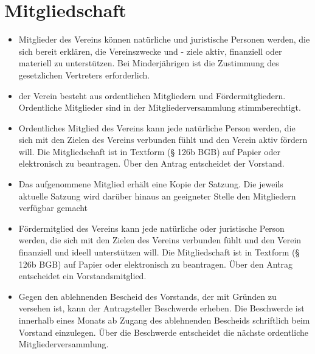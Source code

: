 \documentclass[a4paper,10pt]{article}
\begin{document}
\section{Mitgliedschaft}
  \begin{itemize}
    \item Mitglieder des Vereins können natürliche und juristische Personen werden, die sich bereit erklären, die Vereinszwecke und - ziele aktiv, finanziell oder materiell zu unterstützen. Bei Minderjährigen ist die Zustimmung des gesetzlichen Vertreters erforderlich.  
    \item der Verein besteht aus ordentlichen Mitgliedern und Fördermitgliedern. Ordentliche Mitglieder sind in der Mitgliederversammlung stimmberechtigt.
    \item Ordentliches Mitglied des Vereins kann jede natürliche Person werden, die sich mit den Zielen des Vereins verbunden fühlt und den Verein aktiv fördern will. Die Mitgliedschaft ist in Textform (§ 126b BGB) auf Papier oder elektronisch zu beantragen. Über den Antrag entscheidet der Vorstand.
    \item Das aufgenommene Mitglied erhält eine Kopie der Satzung. Die jeweils aktuelle Satzung wird darüber hinaus an geeigneter Stelle den Mitgliedern verfügbar gemacht
    \item Fördermitglied des Vereins kann jede natürliche oder juristische Person werden, die sich mit den Zielen des Vereins verbunden fühlt und den Verein finanziell und ideell unterstützen will. Die Mitgliedschaft ist in Textform (§ 126b BGB) auf Papier oder elektronisch zu beantragen. Über den Antrag entscheidet ein Vorstandsmitglied.
    \item Gegen den ablehnenden Bescheid des Vorstands, der mit Gründen zu versehen ist, kann der Antragsteller Beschwerde erheben. Die Beschwerde ist innerhalb eines Monats ab Zugang des ablehnenden Bescheids schriftlich beim Vorstand einzulegen. Über die Beschwerde entscheidet die nächste ordentliche Mitgliederversammlung.
  \end{itemize}
  
\end{document}
